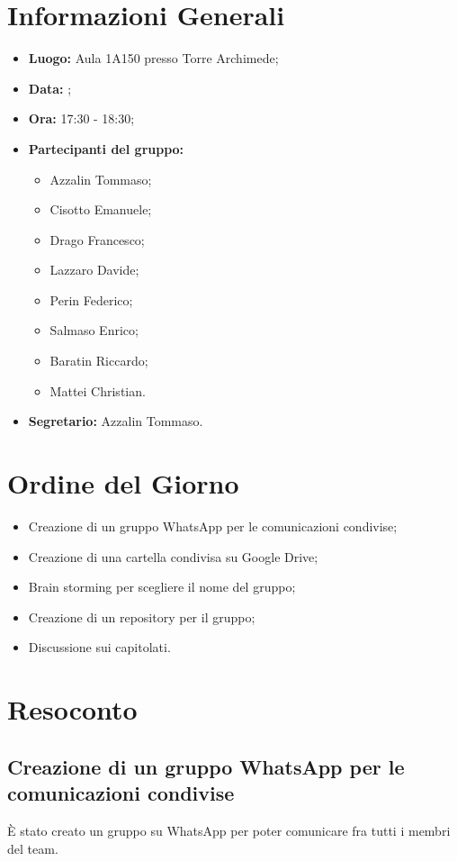 \section{Informazioni Generali}
\begin{itemize}
\item \textbf{Luogo:} Aula 1A150 presso Torre Archimede;
\item \textbf{Data:} \Data;
\item \textbf{Ora:} 17:30 - 18:30;
\item \textbf{Partecipanti del gruppo:}
	\begin{itemize}
	\item Azzalin Tommaso; 
	\item Cisotto Emanuele; 
	\item Drago Francesco;
	\item Lazzaro Davide;
	\item Perin Federico;
	\item Salmaso Enrico;
	\item Baratin Riccardo;
	\item Mattei Christian.
	\end{itemize} 
\item \textbf{Segretario:} Azzalin Tommaso.
\end{itemize}


\section{Ordine del Giorno}
\begin{itemize}
	\item Creazione di un gruppo WhatsApp per le comunicazioni condivise; 
	\item Creazione di una cartella condivisa su Google Drive;
	\item Brain storming per scegliere il nome del gruppo;
	\item Creazione di un repository per il gruppo;
	\item Discussione sui capitolati.
\end{itemize}

\section{Resoconto}
\subsection{Creazione di un gruppo WhatsApp per le comunicazioni condivise}
È stato creato un gruppo su WhatsApp per poter comunicare fra tutti i membri del team.

